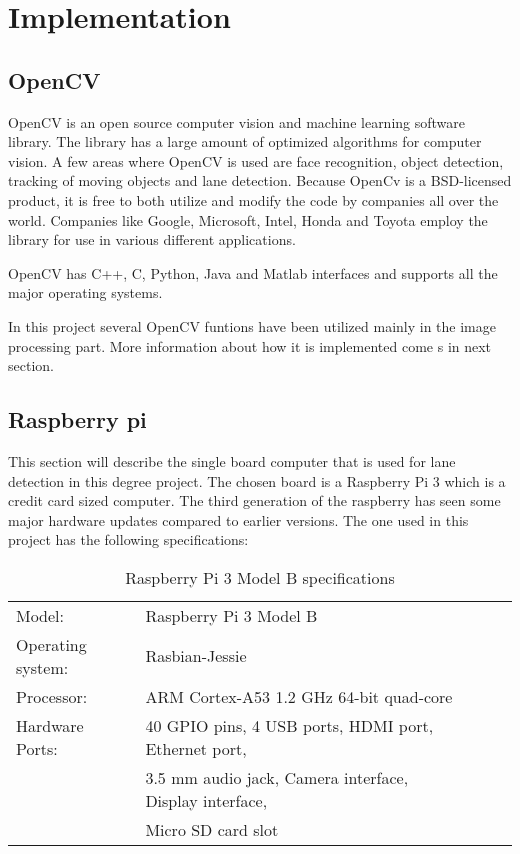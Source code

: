 \chapter{Implementation}

\section{OpenCV}
OpenCV is an open source computer vision and machine learning software library. The library has a large amount of optimized algorithms for computer vision. A few areas where OpenCV is used are face recognition, object detection, tracking of moving objects and lane detection. Because OpenCv is a BSD-licensed product, it is free to both utilize and modify the code by companies all over the world. Companies like Google, Microsoft, Intel, Honda and Toyota employ the library for use in various different applications.

OpenCV has C++, C, Python, Java and Matlab interfaces and supports all the major operating systems.

In this project several OpenCV funtions have been utilized mainly in the image processing part. More information about how it is implemented come s in next section.



\section{Raspberry pi}
This section will describe the single board computer that is used for lane detection in this degree project. The chosen board is a Raspberry Pi 3 which is a credit card sized computer. The third generation of the raspberry has seen some major hardware updates compared to earlier versions. The one used in this project has the following specifications:



\begin{table}[H]
\centering
\caption{Raspberry Pi 3 Model B specifications}
\label{my-label}
\begin{tabular}{lllll}
 Model:	&Raspberry Pi 3 Model B  \\
 Operating system:	&Rasbian-Jessie  \\
 Processor:	&ARM Cortex-A53 1.2 GHz 64-bit quad-core  \\
 Hardware Ports:	&40 GPIO pins, 4 USB ports, HDMI port, Ethernet port,\\  &3.5 mm audio jack, Camera interface, Display interface,\\  &Micro SD card slot
\end{tabular}
\end{table}




